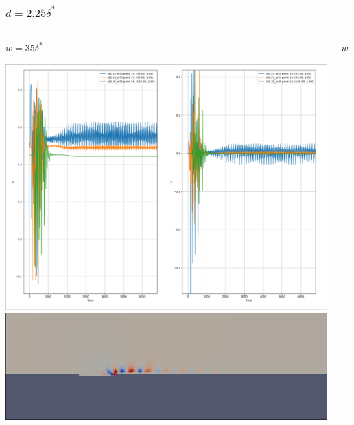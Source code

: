 \documentclass[
  aspectratio=169, %
  t, %
  onlytextwidth, %
  10pt, %
]{beamer}
\begin{document}
\begin{frame}
	\frametitle{$d=2.25\delta^*$}
	
	\centering
	\begin{columns}[T] %
		\begin{column}{0.45\linewidth} %
			$w=35\delta^*$

			\includegraphics[width=\textwidth]{Images/d2.25_w35.png}
			\includegraphics[width=\textwidth]{Images/d2.25_w35_dom.png}
		\end{column}
		\begin{column}{0.45\linewidth} %
			$w=40\delta^*$	


\end{column}
\end{columns}
\end{frame}
\end{document}
